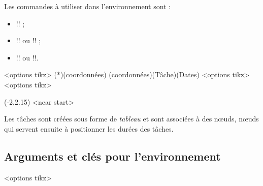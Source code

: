 \documentclass[french,a4paper,11pt]{article}
\begin{document}
{{\begin{cautionblock}
Les commandes à utiliser dans l'environnement sont :

\begin{itemize}
	\item \motcletex!\MPMPlaceNotice! ;
	\item \motcletex!\MPMPlaceTache! ou \motcletex!\MPMPlaceTaches! ;
	\item \motcletex!\MPMPlaceDuree! ou \motcletex!\MPMPlaceDurees!.
\end{itemize}
\vspace*{-\baselineskip}\leavevmode
\end{cautionblock}

\begin{DemoCode}
\begin{GrapheMPM}[clés]<options tikz>
	\MPMPlaceNotice(*)(coordonnées)
	\MPMPlaceTache(coordonnées)(Tâche)(Dates)
	<options tikz>
	<options tikz>
\end{GrapheMPM}
\end{DemoCode}

\begin{DemoCode}[]
\begin{GrapheMPM}
	\MPMPlaceNotice(-2,2.15)
	<near start>
\end{GrapheMPM}
\end{DemoCode}

\begin{tipblock}
Les tâches sont créées sous forme de \textit{tableau} et sont associées à des nœuds, nœuds qui servent ensuite à positionner les durées des tâches.
\end{tipblock}

\pagebreak

\subsection{Arguments et clés pour l'environnement}

\begin{DemoCode}
\begin{GrapheMPM}[clés]<options tikz>
\end{GrapheMPM}
\end{DemoCode}

}}
\end{document}
